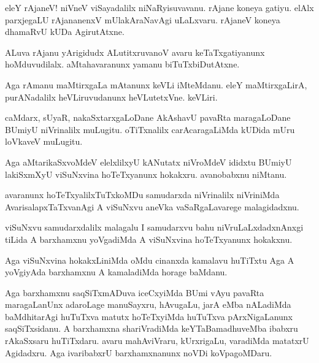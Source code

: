 \begin{mng}
eleY rAjaneV! niVneV viSayadalilx niNaRyisuvavanu. rAjane koneya gatiyu. elAlx parxjegaLU rAjananenxV mUlakAraNavAgi uLaLxvaru. rAjaneV koneya dhamaRvU kUDa AgirutAtxne.
\end{mng}

\begin{mng}
ALuva rAjanu yArigidudx ALutitxruvanoV avaru keTaTxgatiyanunx hoMduvudilalx. aMtahavaranunx yamanu biTuTxbiDutAtxne.
\end{mng}

\begin{mng}
Aga rAmanu maMtirxgaLa mAtanunx keVLi iMteMdanu. eleY maMtirxgaLirA, purANadalilx heVLiruvudanunx heVLutetxVne. keVLiri.
\end{mng}

\begin{mng}
caMdarx, sUyaR, nakaSxtarxgaLoDane AkAshavU pavaRta maragaLoDane BUmiyU niVrinalilx muLugitu. oTiTxnalilx carAcaragaLiMda kUDida mUru loVkaveV muLugitu.
\end{mng}

\begin{mng}
Aga aMtarikaSxvoMdeV elelxlilxyU kANutatx niVroMdeV ididxtu BUmiyU lakiSxmXyU viSuNxvina hoTeTxyanunx hokakxru. avanobabxnu niMtanu.
\end{mng}

\begin{mng}
avaranunx hoTeTxyalilxTuTxkoMDu samudarxda niVrinalilx niVriniMda AvarisalapxTaTxvanAgi A viSuNxvu aneVka vaSaRgaLavarege malagidadxnu.
\end{mng}

\begin{mng}
viSuNxvu samudarxdalilx malagalu I samudarxvu bahu niVruLaLxdadxnAnxgi tiLida A barxhamxnu yoVgadiMda A viSuNxvina hoTeTxyanunx hokakxnu.
\end{mng}

\begin{mng}
Aga viSuNxvina hokakxLiniMda oMdu cinanxda kamalavu huTiTxtu Aga A yoVgiyAda barxhamxnu A kamaladiMda horage baMdanu.
\end{mng}

\begin{mng}
Aga barxhamxnu saqSiTxmADuva iceCxyiMda BUmi vAyu pavaRta maragaLanUnx adaroLage manuSayxru, hAvugaLu, jarA eMba nALadiMda baMdhitarAgi huTuTxva matutx hoTeTxyiMda huTuTxva pArxNigaLanunx saqSiTxsidanu. A barxhamxna shariVradiMda keYTaBamadhuveMba ibabxru rAkaSxsaru huTiTxdaru. avaru mahAviVraru, kUrxrigaLu, varadiMda matatxrU Agidadxru. Aga ivaribabxrU barxhamxnanunx noVDi koVpagoMDaru.
\end{mng}

